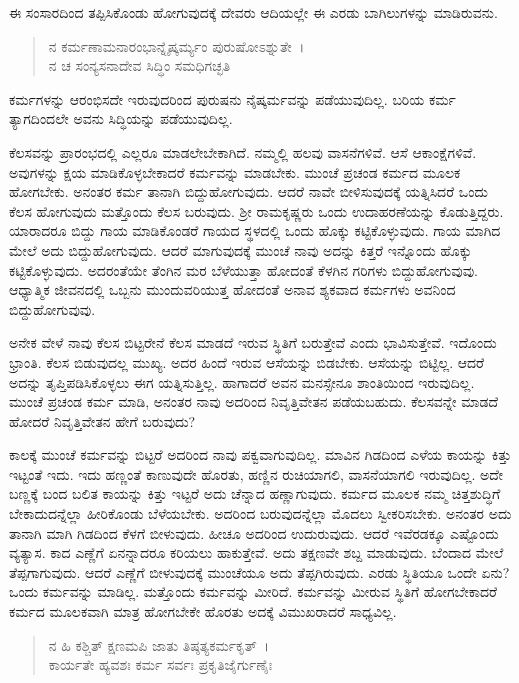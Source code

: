 ಈ ಸಂಸಾರದಿಂದ ತಪ್ಪಿಸಿಕೊಂಡು ಹೋಗುವುದಕ್ಕೆ ದೇವರು ಆದಿಯಲ್ಲೇ ಈ ಎರಡು ಬಾಗಿಲುಗಳನ್ನು ಮಾಡಿರುವನು.

\begin{verse}
ನ ಕರ್ಮಣಾಮನಾರಂಭಾನ್ನೈಷ್ಕರ್ಮ್ಯಂ ಪುರುಷೋಽಶ್ನುತೇ~।\\ನ ಚ ಸಂನ್ಯಸನಾದೇವ ಸಿದ್ಧಿಂ ಸಮಧಿಗಚ್ಛತಿ 
\end{verse}

{\small ಕರ್ಮಗಳನ್ನು ಆರಂಭಿಸದೇ ಇರುವುದರಿಂದ ಪುರುಷನು ನೈಷ್ಕರ್ಮವನ್ನು ಪಡೆಯುವುದಿಲ್ಲ. ಬರಿಯ ಕರ್ಮ ತ್ಯಾಗದಿಂದಲೇ ಅವನು ಸಿದ್ಧಿಯನ್ನು ಪಡೆಯುವುದಿಲ್ಲ.}

ಕೆಲಸವನ್ನು ಪ್ರಾರಂಭದಲ್ಲಿ ಎಲ್ಲರೂ ಮಾಡಲೇಬೇಕಾಗಿದೆ. ನಮ್ಮಲ್ಲಿ ಹಲವು ವಾಸನೆಗಳಿವೆ. ಆಸೆ ಆಕಾಂಕ್ಷೆಗಳಿವೆ. ಅವುಗಳನ್ನು ಕ್ಷಯ ಮಾಡಿಕೊಳ್ಳಬೇಕಾದರೆ ಕರ್ಮವನ್ನು ಮಾಡಬೇಕು. ಮುಂಚೆ ಪ್ರಚಂಡ ಕರ್ಮದ ಮೂಲಕ ಹೋಗಬೇಕು. ಅನಂತರ ಕರ್ಮ ತಾನಾಗಿ ಬಿದ್ದುಹೋಗುವುದು. ಆದರೆ ನಾವೇ ಬೀಳಿಸುವುದಕ್ಕೆ ಯತ್ನಿಸಿದರೆ ಒಂದು ಕೆಲಸ ಹೋಗುವುದು ಮತ್ತೊಂದು ಕೆಲಸ ಬರುವುದು. ಶ‍್ರೀ ರಾಮಕೃಷ್ಣರು ಒಂದು ಉದಾಹರಣೆಯನ್ನು ಕೊಡುತ್ತಿದ್ದರು. ಯಾರಾದರೂ ಬಿದ್ದು ಗಾಯ ಮಾಡಿಕೊಂಡರೆ ಗಾಯದ ಸ್ಥಳದಲ್ಲಿ ಒಂದು ಹೊಕ್ಕು ಕಟ್ಟಿಕೊಳ್ಳುವುದು. ಗಾಯ ಮಾಗಿದ ಮೇಲೆ ಅದು ಬಿದ್ದುಹೋಗುವುದು. ಆದರೆ ಮಾಗುವುದಕ್ಕೆ ಮುಂಚೆ ನಾವು ಅದನ್ನು ಕಿತ್ತರೆ ಇನ್ನೊಂದು ಹೊಕ್ಕು ಕಟ್ಟಿಕೊಳ್ಳುವುದು. ಅದರಂತೆಯೇ ತೆಂಗಿನ ಮರ ಬೆಳೆಯುತ್ತಾ ಹೋದಂತೆ ಕೆಳಗಿನ ಗರಿಗಳು ಬಿದ್ದುಹೋಗುವುವು. ಆಧ್ಯಾತ್ಮಿಕ ಜೀವನದಲ್ಲಿ ಒಬ್ಬನು ಮುಂದುವರಿಯುತ್ತ ಹೋದಂತೆ ಅನಾವ ಶ್ಯಕವಾದ ಕರ್ಮಗಳು ಅವನಿಂದ ಬಿದ್ದುಹೋಗುವುವು.

ಅನೇಕ ವೇಳೆ ನಾವು ಕೆಲಸ ಬಿಟ್ಟರೇನೆ ಕೆಲಸ ಮಾಡದೆ ಇರುವ ಸ್ಥಿತಿಗೆ ಬರುತ್ತೇವೆ ಎಂದು ಭಾವಿಸುತ್ತೇವೆ. ಇದೊಂದು ಭ್ರಾಂತಿ. ಕೆಲಸ ಬಿಡುವುದಲ್ಲ ಮುಖ್ಯ. ಅದರ ಹಿಂದೆ ಇರುವ ಆಸೆಯನ್ನು ಬಿಡಬೇಕು. ಆಸೆಯನ್ನು ಬಿಟ್ಟಿಲ್ಲ. ಆದರೆ ಅದನ್ನು ತೃಪ್ತಿಪಡಿಸಿಕೊಳ್ಳಲು ಈಗ ಯತ್ನಿಸುತ್ತಿಲ್ಲ. ಹಾಗಾದರೆ ಅವನ ಮನಸ್ಸೇನೂ ಶಾಂತಿಯಿಂದ ಇರುವುದಿಲ್ಲ. ಮುಂಚೆ ಪ್ರಚಂಡ ಕರ್ಮ ಮಾಡಿ, ಅನಂತರ ನಾವು ಅದರಿಂದ ನಿವೃತ್ತಿವೇತನ ಪಡೆಯಬಹುದು. ಕೆಲಸವನ್ನೇ ಮಾಡದೆ ಹೋದರೆ ನಿವೃತ್ತಿವೇತನ ಹೇಗೆ ಬರುವುದು?

ಕಾಲಕ್ಕೆ ಮುಂಚೆ ಕರ್ಮವನ್ನು ಬಿಟ್ಟರೆ ಅದರಿಂದ ನಾವು ಪಕ್ವವಾಗುವುದಿಲ್ಲ. ಮಾವಿನ ಗಿಡದಿಂದ ಎಳೆಯ ಕಾಯನ್ನು ಕಿತ್ತು ಇಟ್ಟಂತೆ ಇದು. ಇದು ಹಣ್ಣಂತೆ ಕಾಣುವುದೇ ಹೊರತು, ಹಣ್ಣಿನ ರುಚಿಯಾಗಲಿ, ವಾಸನೆಯಾಗಲಿ ಇರುವುದಿಲ್ಲ. ಅದೇ ಬಣ್ಣಕ್ಕೆ ಬಂದ ಬಲಿತ ಕಾಯನ್ನು ಕಿತ್ತು ಇಟ್ಟರೆ ಅದು ಚೆನ್ನಾದ ಹಣ್ಣಾಗುವುದು. ಕರ್ಮದ ಮೂಲಕ ನಮ್ಮ ಚಿತ್ತಶುದ್ಧಿಗೆ ಬೇಕಾದುದನ್ನೆಲ್ಲಾ ಹೀರಿಕೊಂಡು ಬೆಳೆಯಬೇಕು. ಅದರಿಂದ ಬರುವುದನ್ನೆಲ್ಲಾ ಮೊದಲು ಸ್ವೀಕರಿಸಬೇಕು. ಅನಂತರ ಅದು ತಾನಾಗಿ ಮಾಗಿ ಗಿಡದಿಂದ ಕೆಳಗೆ ಬೀಳುವುದು. ಹೀಚೂ ಅದರಿಂದ ಉದುರುವುದು. ಆದರೆ ಇವೆರಡಕ್ಕೂ ಎಷ್ಟೊಂದು ವ್ಯತ್ಯಾಸ. ಕಾದ ಎಣ್ಣೆಗೆ ಏನನ್ನಾದರೂ ಕರಿಯಲು ಹಾಕುತ್ತೇವೆ. ಅದು ತಕ್ಷಣವೇ ಶಬ್ದ ಮಾಡುವುದು. ಬೆಂದಾದ ಮೇಲೆ ತೆಪ್ಪಗಾಗುವುದು. ಆದರೆ ಎಣ್ಣೆಗೆ ಬೀಳುವುದಕ್ಕೆ ಮುಂಚೆಯೂ ಅದು ತೆಪ್ಪಗಿರುವುದು. ಎರಡು ಸ್ಥಿತಿಯೂ ಒಂದೇ ಏನು? ಒಂದು ಕರ್ಮವನ್ನು ಮಾಡಿಲ್ಲ. ಮತ್ತೊಂದು ಕರ್ಮವನ್ನು ಮೀರಿದೆ. ಕರ್ಮವನ್ನು ಮೀರುವ ಸ್ಥಿತಿಗೆ ಹೋಗಬೇಕಾದರೆ ಕರ್ಮದ ಮೂಲಕವಾಗಿ ಮಾತ್ರ ಹೋಗಬೇಕೇ ಹೊರತು ಅದಕ್ಕೆ ವಿಮುಖರಾದರೆ ಸಾಧ್ಯವಿಲ್ಲ.

\begin{verse}
ನ ಹಿ ಕಶ್ಚಿತ್ ಕ್ಷಣಮಪಿ ಜಾತು ತಿಷ್ಠತ್ಯಕರ್ಮಕೃತ್~।\\ಕಾರ್ಯತೇ ಹ್ಯವಶಃ ಕರ್ಮ ಸರ್ವಃ ಪ್ರಕೃತಿಜೈರ್ಗುಣೈಃ 
\end{verse}

